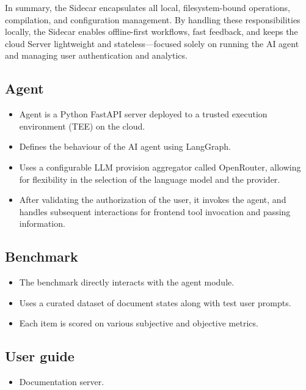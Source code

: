 In summary, the Sidecar encapsulates all local, filesystem-bound operations, compilation, and configuration management. By handling these responsibilities locally, the Sidecar enables offline-first workflows, fast feedback, and keeps the cloud Server lightweight and stateless---focused solely on running the AI agent and managing user authentication and analytics.






\subsection{Agent}

\begin{itemize}
    \item Agent is a Python FastAPI server deployed to a trusted execution environment (TEE) on the cloud.
    \item Defines the behaviour of the AI agent using LangGraph.
    \item Uses a configurable LLM provision aggregator called OpenRouter, allowing for flexibility in the selection of the language model and the provider.
    \item After validating the authorization of the user, it invokes the agent, and handles subsequent interactions for frontend tool invocation and passing information.
\end{itemize}

\subsection{Benchmark}

\begin{itemize}
    \item The benchmark directly interacts with the agent module.
    \item Uses a curated dataset of document states along with test user prompts.
    \item Each item is scored on various subjective and objective metrics.
\end{itemize}

\subsection{User guide}

\begin{itemize}
    \item Documentation server.
\end{itemize}
